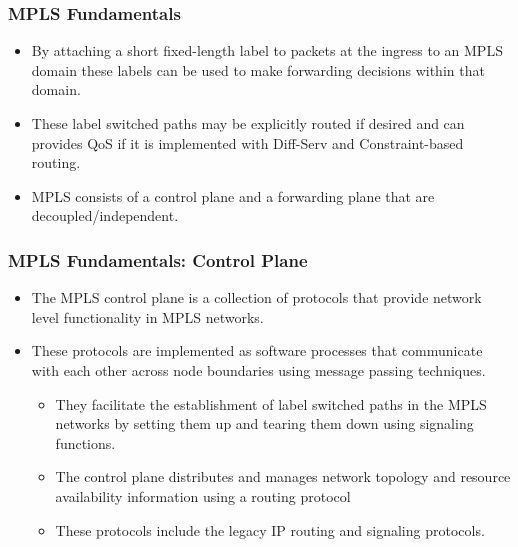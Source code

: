 \documentclass[12pt]{beamer}
\begin{document}
\begin{frame}
    \frametitle{MPLS Fundamentals}
    \begin{itemize}
        \item By attaching a short fixed-length label to packets at the ingress to an MPLS domain these labels can be used to make forwarding decisions within that domain.
        \item These label switched paths may be explicitly routed if desired and can provides QoS if it is implemented with Diff-Serv and Constraint-based routing.
        \item MPLS consists of a control plane and a forwarding plane that are decoupled/independent.
    \end{itemize}
\end{frame}

\begin{frame}
	\frametitle{MPLS Fundamentals: Control Plane}
	\begin{itemize}
	    \item The MPLS control plane is a collection of protocols that provide network level functionality in MPLS networks.
	    \item These protocols are implemented as software processes that communicate with each other across node boundaries using message passing techniques.
    \begin{itemize}
        \item They facilitate the establishment of label switched paths in the MPLS networks by setting them up and tearing them down using signaling functions.
		\item The control plane distributes and manages network topology and resource availability information using a routing protocol
		\item These protocols include the legacy IP routing and signaling protocols.
	\end{itemize}
    \end{itemize}
\end{frame}
\end{document}

